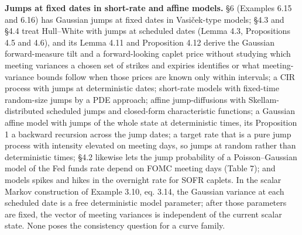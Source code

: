 \documentclass[11pt]{article}
\begin{document}
\textbf{Jumps at fixed dates in short-rate and affine models.} \cite{kellerressel2018affine} §6 (Examples 6.15 and 6.16) has Gaussian jumps at fixed dates in Vasiček-type models; \cite{fontana2022term} §4.3 and §4.4 treat Hull--White with jumps at scheduled dates (Lemma 4.3, Propositions 4.5 and 4.6), and its Lemma 4.11 and Proposition 4.12 derive the Gaussian forward-measure tilt and a forward-looking caplet price without studying which meeting variances a chosen set of strikes and expiries identifies or what meeting-variance bounds follow when those prices are known only within intervals; \cite{fontana2025extended} a CIR process with jumps at deterministic dates; \cite{calvia2025short} short-rate models with fixed-time random-size jumps by a PDE approach; \cite{silva2024discretely} affine jump-diffusions with Skellam-distributed scheduled jumps and closed-form characteristic functions; \cite{kim2014jumps} a Gaussian affine model with jumps of the whole state at deterministic times, its Proposition 1 a backward recursion across the jump dates; \cite{piazzesi2005bond} a target rate that is a pure jump process with intensity elevated on meeting days, so jumps at random rather than deterministic times; \cite{das2002surprise} §4.2 likewise lets the jump probability of a Poisson--Gaussian model of the Fed funds rate depend on FOMC meeting days (Table 7); and \cite{andersen2024spike} models spikes and hikes in the overnight rate for SOFR caplets. In the scalar Markov construction of \cite{fontana2022term} Example 3.10, eq. 3.14, the Gaussian variance at each scheduled date is a free deterministic model parameter; after those parameters are fixed, the vector of meeting variances is independent of the current scalar state. None poses the consistency question for a curve family.
\end{document}
